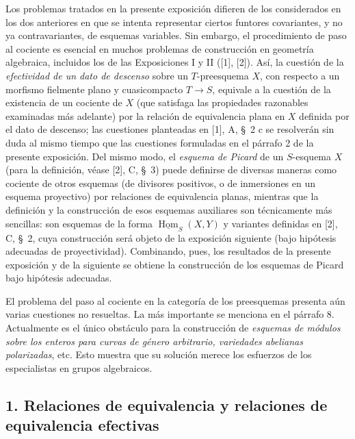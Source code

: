 \documentclass[11pt,twoside,openany]{book}
\numberwithin{equation}{section}
\newcommand{\src}[1]{%
  \phantomsection\hypertarget{src:#1}{}%
  \marginpar{\raggedleft\footnotesize\sffamily #1}%
}
\theoremstyle{plain}
\theoremstyle{definition}
\theoremstyle{remark}
\newcommand{\FgaUnitKey}{frontmatter}
\renewcommand{\src}[1]{%
  \phantomsection\hypertarget{src:\FgaUnitKey:#1}{}%
  \marginpar{\raggedleft\footnotesize\sffamily #1}%
}
\theoremstyle{plain}
\theoremstyle{definition}
\theoremstyle{remark}
\begin{document}
Los problemas tratados en la presente exposición difieren de los considerados en
los dos anteriores en que se intenta representar ciertos funtores covariantes,
y no ya contravariantes, de esquemas variables. Sin embargo, el procedimiento
de paso al cociente es esencial en muchos problemas de construcción en
geometría algebraica, incluidos los de las Exposiciones I y II ([1], [2]). Así, la
cuestión de la \emph{efectividad de un dato de descenso} sobre un
$T$-preesquema $X$, con respecto a un morfismo fielmente plano y cuasicompacto
$T\longrightarrow S$, equivale a la cuestión de la existencia de un cociente
de $X$ (que satisfaga las propiedades razonables examinadas más adelante) por
la relación de equivalencia plana en $X$ definida por el dato de descenso; las
cuestiones planteadas en [1], A, \S~2 c se resolverán sin duda al mismo tiempo
que las cuestiones formuladas en el párrafo 2 de la presente exposición. Del mismo
modo, el \emph{esquema de Picard} de un $S$-esquema $X$ (para la definición,
véase [2], C, \S~3) puede definirse de diversas maneras como cociente de otros
esquemas (de divisores positivos, o de inmersiones en un esquema proyectivo)
por relaciones de equivalencia planas, mientras que la definición y la
construcción de esos esquemas auxiliares son técnicamente más sencillas: son
esquemas de la forma $\underline{\operatorname{Hom}}_S(X,Y)$ y variantes
definidas en [2], C, \S~2, cuya construcción será objeto de la exposición siguiente
(bajo hipótesis adecuadas de proyectividad). Combinando, pues, los resultados
de la presente exposición y de la siguiente se obtiene la construcción de los esquemas
de Picard bajo hipótesis adecuadas.

El problema del paso al cociente en la categoría de los preesquemas presenta
aún varias cuestiones no resueltas. La más importante se menciona en el
párrafo 8. Actualmente es el único obstáculo para la construcción de
\emph{esquemas de módulos sobre los enteros para curvas de género arbitrario,
variedades abelianas polarizadas}, etc. Esto muestra que su solución merece
los esfuerzos de los especialistas en grupos algebraicos.

\src{100}
\subsection*{1. Relaciones de equivalencia y relaciones de equivalencia efectivas}
\end{document}
